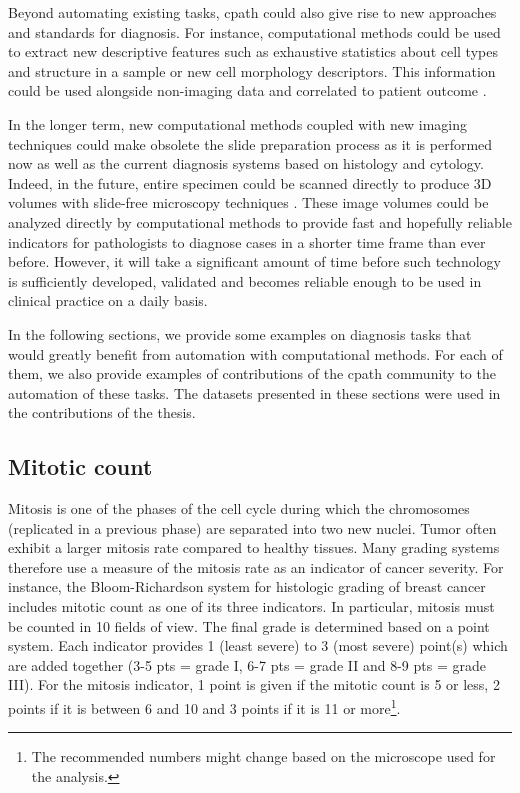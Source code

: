 Beyond automating existing tasks, \acrlong{cpath} could also give rise to new approaches and standards for diagnosis. For instance, computational methods could be used to extract new descriptive features such as exhaustive statistics about cell types and structure in a sample or new cell morphology descriptors. This information could be used alongside non-imaging data and correlated to patient outcome \cite{abels2019computational}. 

In the longer term, new computational methods coupled with new imaging techniques could make obsolete the slide preparation process as it is performed now as well as the current diagnosis systems based on histology and cytology. Indeed, in the future, entire specimen could be scanned directly to produce 3D volumes with slide-free microscopy techniques \cite{np2017histopathology, liu2021slide}. These image volumes could be analyzed directly by computational methods to provide fast and hopefully reliable indicators for pathologists to diagnose cases in a shorter time frame than ever before. However, it will take a significant amount of time before such technology is sufficiently developed, validated and becomes reliable enough to be used in clinical practice on a daily basis. 

In the following sections, we provide some examples on diagnosis tasks that would greatly benefit from automation with computational methods. For each of them, we also provide examples of contributions of the \acrlong{cpath} community to the automation of these tasks. The datasets presented in these sections were used in the contributions of the thesis. 

\subsection{Mitotic count}
\label{ssec:backdp:analysis_mitotic_count}

Mitosis is one of the phases of the cell cycle during which the chromosomes (replicated in a previous phase) are separated into two new nuclei. Tumor often exhibit a larger mitosis rate compared to healthy tissues. Many grading systems therefore use a measure of the mitosis rate as an indicator of cancer severity. For instance, the Bloom-Richardson system \cite{roychowdhury2022bloomrichardson} for histologic grading of breast cancer includes mitotic count as one of its three indicators. In particular, mitosis must be counted in 10 fields of view. The final grade is determined based on a point system. Each indicator provides 1 (least severe) to 3 (most severe) point(s) which are added together (3-5 pts = grade I, 6-7 pts = grade II and 8-9 pts = grade III). For the mitosis indicator, 1 point is given if the mitotic count is 5 or less, 2 points if it is between 6 and 10 and 3 points if it is 11 or more\footnote{The recommended numbers might change based on the microscope used for the analysis.}. 

